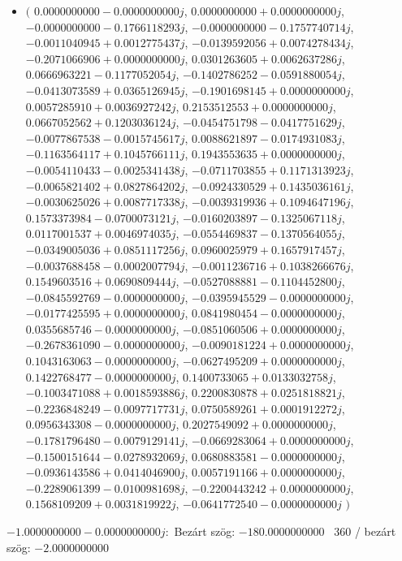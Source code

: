 \documentclass[14pt,a4paper]{article}
\begin{document}
\begin{itemize}
\item
$\big($
$0.0000000000-0.0000000000j$, $0.0000000000+0.0000000000j$, $-0.0000000000-0.1766118293j$, $-0.0000000000-0.1757740714j$, $-0.0011040945+0.0012775437j$, $-0.0139592056+0.0074278434j$, $-0.2071066906+0.0000000000j$, $0.0301263605+0.0062637286j$, $0.0666963221-0.1177052054j$, $-0.1402786252-0.0591880054j$, $-0.0413073589+0.0365126945j$, $-0.1901698145+0.0000000000j$, $0.0057285910+0.0036927242j$, $0.2153512553+0.0000000000j$, $0.0667052562+0.1203036124j$, $-0.0454751798-0.0417751629j$, $-0.0077867538-0.0015745617j$, $0.0088621897-0.0174931083j$, $-0.1163564117+0.1045766111j$, $0.1943553635+0.0000000000j$, $-0.0054110433-0.0025341438j$, $-0.0711703855+0.1171313923j$, $-0.0065821402+0.0827864202j$, $-0.0924330529+0.1435036161j$, $-0.0030625026+0.0087717338j$, $-0.0039319936+0.1094647196j$, $0.1573373984-0.0700073121j$, $-0.0160203897-0.1325067118j$, $0.0117001537+0.0046974035j$, $-0.0554469837-0.1370564055j$, $-0.0349005036+0.0851117256j$, $0.0960025979+0.1657917457j$, $-0.0037688458-0.0002007794j$, $-0.0011236716+0.1038266676j$, $0.1549603516+0.0690809444j$, $-0.0527088881-0.1104452800j$, $-0.0845592769-0.0000000000j$, $-0.0395945529-0.0000000000j$, $-0.0177425595+0.0000000000j$, $0.0841980454-0.0000000000j$, $0.0355685746-0.0000000000j$, $-0.0851060506+0.0000000000j$, $-0.2678361090-0.0000000000j$, $-0.0090181224+0.0000000000j$, $0.1043163063-0.0000000000j$, $-0.0627495209+0.0000000000j$, $0.1422768477-0.0000000000j$, $0.1400733065+0.0133032758j$, $-0.1003471088+0.0018593886j$, $0.2200830878+0.0251818821j$, $-0.2236848249-0.0097717731j$, $0.0750589261+0.0001912272j$, $0.0956343308-0.0000000000j$, $0.2027549092+0.0000000000j$, $-0.1781796480-0.0079129141j$, $-0.0669283064+0.0000000000j$, $-0.1500151644-0.0278932069j$, $0.0680883581-0.0000000000j$, $-0.0936143586+0.0414046900j$, $0.0057191166+0.0000000000j$, $-0.2289061399-0.0100981698j$, $-0.2200443242+0.0000000000j$, $0.1568109209+0.0031819922j$, $-0.0641772540-0.0000000000j$
$\big)$
\end{itemize}
$-1.0000000000-0.0000000000j$:\
Bezárt szög: $-180.0000000000$ \
360 / bezárt szög: $-2.0000000000$\
\end{document}
